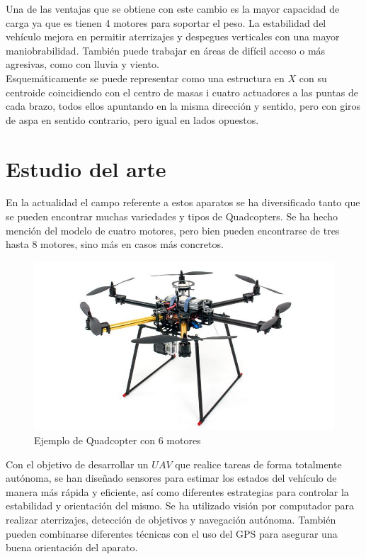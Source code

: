 \documentclass[twoside,11pt]{report}
\begin{document}
Una de las ventajas que se obtiene con este cambio es la mayor capacidad de carga ya que es tienen 4 motores  para soportar el peso. La estabilidad del vehículo mejora en permitir aterrizajes y despegues verticales con una mayor maniobrabilidad. También puede trabajar en áreas de difícil acceso o más agresivas, como con lluvia y viento. \\

Esquemáticamente se puede representar como una estructura en $X$ con su centroide coincidiendo con el centro de masas i cuatro actuadores a las puntas de cada brazo, todos ellos apuntando en la misma dirección y sentido, pero con giros de aspa en sentido contrario, pero igual en lados opuestos.


\section{Estudio del arte}

En la actualidad el campo referente a estos aparatos se ha diversificado tanto que se pueden encontrar muchas variedades y tipos de Quadcopters. Se ha hecho mención del modelo de cuatro motores, pero bien pueden encontrarse de tres hasta 8 motores, sino más en casos más concretos. \\

\begin{figure}[h!]
\begin{center}
\includegraphics[scale=0.3]{images/6_armed_quadcopter.jpg}
\caption{Ejemplo de Quadcopter con 6 motores}
\end{center}
\end{figure}

Con el objetivo de desarrollar un $UAV$ que realice tareas de forma totalmente autónoma, se han diseñado sensores para estimar los estados del vehículo de manera más rápida y eficiente, así como diferentes estrategias para controlar la estabilidad y orientación del mismo. Se ha utilizado visión  por computador para realizar aterrizajes, detección de objetivos y navegación autónoma. También pueden combinarse diferentes técnicas con el uso del GPS para asegurar una buena orientación del aparato. \\
\end{document}
